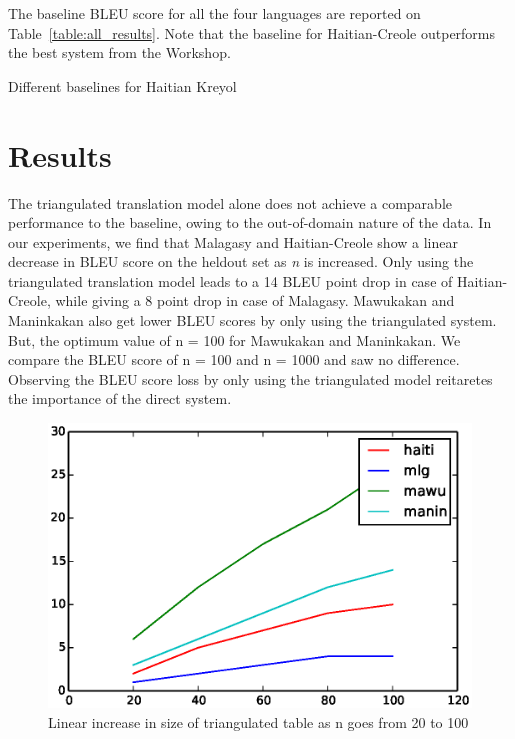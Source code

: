 The baseline BLEU score for all the four languages are reported on Table~\ref{table:all_results}. Note that the baseline for Haitian-Creole outperforms the best system from the Workshop. 

\begin{table}
	\small
	\centering
	
	\caption{Different baselines for Haitian Kreyol}
	\label{table:haiti_baselines}
\end{table}




\section{Results}
\label{sec:results}
 The triangulated translation model alone does not achieve a comparable performance to the baseline, owing to the out-of-domain nature of the data. In our experiments, we find that Malagasy and Haitian-Creole show a linear decrease in BLEU score on the heldout set as \emph{n} is increased. Only using the triangulated translation model leads to a 14 BLEU point drop in case of Haitian-Creole, while giving a 8 point drop in case of Malagasy. Mawukakan and Maninkakan also get lower BLEU scores by only using the triangulated system. But, the optimum value of n = 100 for Mawukakan and Maninkakan. We compare the BLEU score of n = 100 and n = 1000 and saw no difference. Observing the BLEU score loss by only using the triangulated model reitaretes the importance of the direct system.  %
\begin{figure}[t]
                \small
                \centering
                \includegraphics[scale=0.5]{files/Figures/multiplication_factors.eps}
                \caption{Linear increase in size of triangulated table as n goes from 20 to 100}
                \label{fig:multiplication_factors}

\end{figure}


